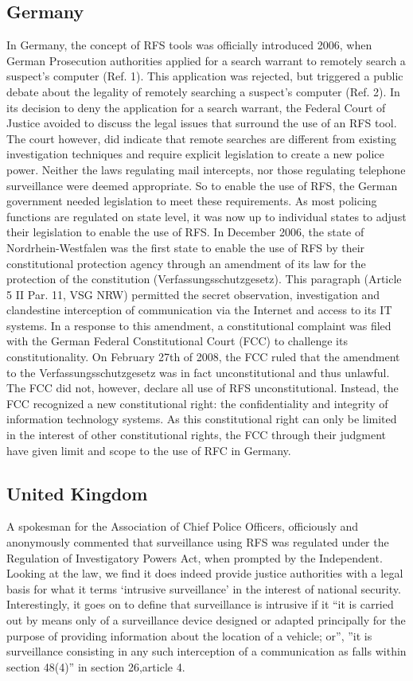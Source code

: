 \documentclass[11pt]{article} %
\begin{document}
\subsection{Germany}
In Germany, the concept of RFS tools was officially introduced 2006, when German Prosecution authorities applied for a search warrant to remotely search a suspect's computer (Ref. 1).
This application was rejected, but triggered a public debate about the legality of remotely searching a suspect's computer (Ref. 2).
In its decision to deny the application for a search warrant, the Federal Court of Justice avoided to discuss the legal issues that surround the use of an RFS tool.
The court however, did indicate that remote searches are different from existing investigation techniques and require explicit legislation to create a new police power.
Neither the laws regulating mail intercepts, nor those regulating telephone surveillance were deemed appropriate.
So to enable the use of RFS, the German government needed legislation to meet these requirements.
As most policing functions are regulated on state level, it was now up to individual states to adjust their legislation to enable the use of RFS.
In December 2006, the state of Nordrhein-Westfalen was the first state to enable the use of RFS by their constitutional protection agency through an amendment of its law for the protection of the constitution (Verfassungsschutzgesetz).
This paragraph (Article 5 II Par. 11, VSG NRW) permitted the secret observation, investigation and clandestine interception of communication via the Internet and access to its IT systems.
In a response to this amendment, a constitutional complaint was filed with the German Federal Constitutional Court (FCC) to challenge its constitutionality. On February 27th of 2008, the FCC ruled that the amendment to the Verfassungsschutzgesetz was in fact unconstitutional and thus unlawful. The FCC did not, however, declare all use of RFS unconstitutional. Instead, the FCC recognized a new constitutional right: the confidentiality and integrity of information technology systems. As this constitutional right can only be limited in the interest of other constitutional rights, the FCC through their judgment have given limit and scope to the use of RFC in Germany.

\subsection{United Kingdom}
A spokesman for the Association of Chief Police Officers, officiously and anonymously commented that surveillance using RFS was regulated under the Regulation of Investigatory Powers Act, when prompted by the Independent. \cite{independent}
Looking at the law, we find it does indeed provide justice authorities with a legal basis for what it terms `intrusive surveillance' in the interest of national security. \cite{regul_invest}
Interestingly, it goes on to define that surveillance is intrusive if it ``it is carried out by means only of a surveillance device designed or adapted principally for the purpose of providing information about the location of a vehicle; or'', ''it is surveillance consisting in any such interception of a communication as falls within section 48(4)'' in section 26,article 4.
\end{document}
